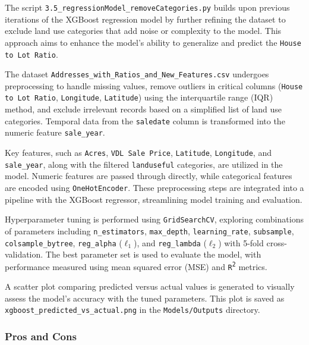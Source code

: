 The script \texttt{3.5\_regressionModel\_removeCategories.py} builds upon previous iterations of the XGBoost regression model by further refining the dataset to exclude land use categories that add noise or complexity to the model. This approach aims to enhance the model's ability to generalize and predict the \texttt{House to Lot Ratio}.

The dataset \texttt{Addresses\_with\_Ratios\_and\_New\_Features.csv} undergoes preprocessing to handle missing values, remove outliers in critical columns (\texttt{House to Lot Ratio}, \texttt{Longitude}, \texttt{Latitude}) using the interquartile range (IQR) method, and exclude irrelevant records based on a simplified list of land use categories. Temporal data from the \texttt{saledate} column is transformed into the numeric feature \texttt{sale\_year}.

Key features, such as \texttt{Acres}, \texttt{VDL Sale Price}, \texttt{Latitude}, \texttt{Longitude}, and \texttt{sale\_year}, along with the filtered \texttt{landuseful} categories, are utilized in the model. Numeric features are passed through directly, while categorical features are encoded using \texttt{OneHotEncoder}. These preprocessing steps are integrated into a pipeline with the XGBoost regressor, streamlining model training and evaluation.

Hyperparameter tuning is performed using \texttt{GridSearchCV}, exploring combinations of parameters including \texttt{n\_estimators}, \texttt{max\_depth}, \texttt{learning\_rate}, \texttt{subsample}, \texttt{colsample\_bytree}, \texttt{reg\_alpha} (\(\ell_1\)), and \texttt{reg\_lambda} (\(\ell_2\)) with 5-fold cross-validation. The best parameter set is used to evaluate the model, with performance measured using mean squared error (MSE) and \texttt{R\textsuperscript{2}} metrics.

A scatter plot comparing predicted versus actual values is generated to visually assess the model’s accuracy with the tuned parameters. This plot is saved as \texttt{xgboost\_predicted\_vs\_actual.png} in the \texttt{Models/Outputs} directory.

\subsubsection*{Pros and Cons}

